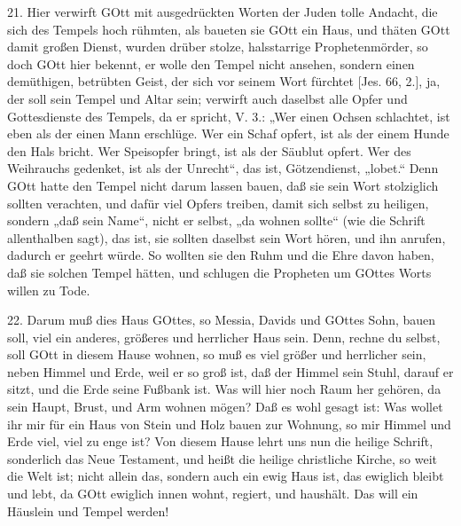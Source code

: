 21. Hier verwirft GOtt mit ausgedrückten Worten der Juden tolle Andacht, die sich des Tempels hoch rühmten, als baueten sie GOtt ein Haus, und thäten GOtt damit großen Dienst, wurden drüber stolze, halsstarrige Prophetenmörder, so doch GOtt hier bekennt, er wolle den Tempel nicht ansehen, sondern einen demüthigen, betrübten Geist, der sich vor seinem Wort fürchtet [Jes. 66, 2.], ja, der soll sein Tempel und Altar sein; verwirft auch daselbst alle Opfer und Gottesdienste des Tempels, da er spricht, V. 3.: „Wer einen Ochsen schlachtet, ist eben als der einen Mann erschlüge. Wer ein Schaf opfert, ist als der einem Hunde den Hals bricht. Wer Speisopfer bringt, ist als der Säublut opfert. Wer des Weihrauchs gedenket, ist als der Unrecht“, das ist, Götzendienst, „lobet.“ Denn GOtt hatte den Tempel nicht darum lassen bauen, daß sie sein Wort stolziglich sollten verachten, und dafür viel Opfers treiben, damit sich selbst zu heiligen, sondern „daß sein Name“, nicht er selbst, „da wohnen sollte“ (wie die Schrift allenthalben sagt), das ist, sie sollten daselbst sein Wort hören, und ihn anrufen, dadurch er geehrt würde. So wollten sie den Ruhm und die Ehre davon haben, daß sie solchen Tempel hätten, und schlugen die Propheten um GOttes Worts willen zu Tode.

22. Darum muß dies Haus GOttes, so Messia, Davids und GOttes Sohn, bauen soll, viel ein anderes, größeres und herrlicher Haus sein. Denn, rechne du selbst, soll GOtt in diesem Hause wohnen, so muß es viel größer und herrlicher sein, neben Himmel und Erde, weil er so groß ist, daß der Himmel sein Stuhl, darauf er sitzt, und die Erde seine Fußbank ist. Was will hier noch Raum her gehören, da sein Haupt, Brust, und Arm wohnen mögen? Daß es wohl gesagt ist: Was wollet ihr mir für ein Haus von Stein und Holz bauen zur Wohnung, so mir Himmel und Erde viel, viel zu enge ist? Von diesem Hause lehrt uns nun die heilige Schrift, sonderlich das Neue Testament, und heißt die heilige christliche Kirche, so weit die Welt ist; nicht allein das, sondern auch ein ewig Haus ist, das ewiglich bleibt und lebt, da GOtt ewiglich innen wohnt, regiert, und haushält. Das will ein Häuslein und Tempel werden!

